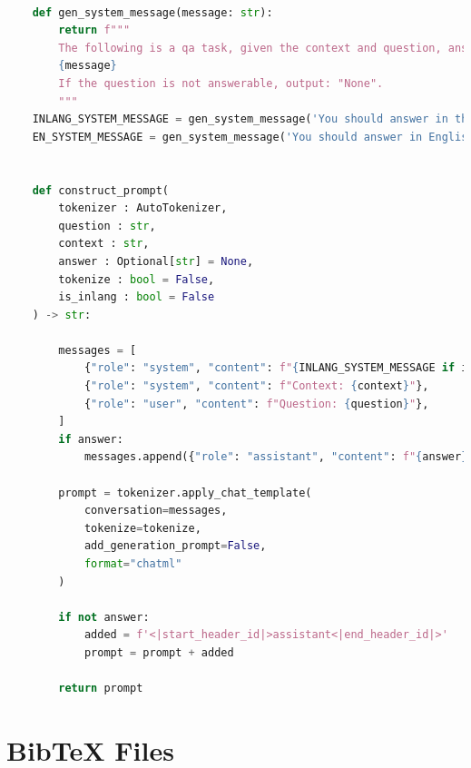 \documentclass[11pt]{article}
\begin{document}
\begin{lstlisting}[language=Python]

    def gen_system_message(message: str):
        return f"""
        The following is a qa task, given the context and question, answer the question.The answer will be in the context.
        {message}
        If the question is not answerable, output: "None".
        """
    INLANG_SYSTEM_MESSAGE = gen_system_message('You should answer in the same language as the question.')
    EN_SYSTEM_MESSAGE = gen_system_message('You should answer in English.')
    
    
    def construct_prompt(
        tokenizer : AutoTokenizer,
        question : str,
        context : str,
        answer : Optional[str] = None,
        tokenize : bool = False,
        is_inlang : bool = False
    ) -> str:
        
        messages = [
            {"role": "system", "content": f"{INLANG_SYSTEM_MESSAGE if is_inlang else EN_SYSTEM_MESSAGE}"},
            {"role": "system", "content": f"Context: {context}"},
            {"role": "user", "content": f"Question: {question}"},
        ]
        if answer:
            messages.append({"role": "assistant", "content": f"{answer}"})
    
        prompt = tokenizer.apply_chat_template(
            conversation=messages, 
            tokenize=tokenize, 
            add_generation_prompt=False, 
            format="chatml"
        )
        
        if not answer:
            added = f'<|start_header_id|>assistant<|end_header_id|>'
            prompt = prompt + added
            
        return prompt
\end{lstlisting}





\section{Bib\TeX{} Files}
\label{sec:bibtex}
\end{document}
